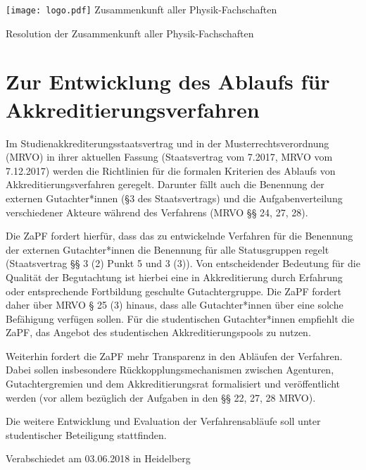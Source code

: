 \documentclass[DIV=calc]{scrartcl}
\begin{document}
    \hspace{0.87\textwidth}
    \begin{minipage}{120pt}
        \vspace{-1.8cm}
        \texttt{[image: logo.pdf]}
        \centering
        \small Zusammenkunft aller Physik-Fachschaften
    \end{minipage}
    \begin{center}
        \huge{Resolution der Zusammenkunft aller Physik-Fachschaften}\vspace{.25\baselineskip}\\
        \normalsize
    \end{center}
    \vspace{1cm} 
\section*{Zur Entwicklung des Ablaufs für Akkreditierungsverfahren}
Im Studienakkrediterungsstaatsvertrag und in der Musterrechtsverordnung (MRVO) in ihrer aktuellen Fassung (Staatsvertrag vom 7.2017, MRVO vom 7.12.2017) werden die Richtlinien für die formalen Kriterien des Ablaufs von Akkreditierungsverfahren geregelt. Darunter fällt auch die Benennung der externen Gutachter*innen (§3 des Staatsvertrags) und die Aufgabenverteilung verschiedener Akteure während des Verfahrens (MRVO §§ 24, 27, 28).

Die ZaPF fordert hierfür, dass das zu entwickelnde Verfahren für die Benennung der externen Gutachter*innen die Benennung für alle Statusgruppen regelt (Staatsvertrag §§ 3 (2) Punkt 5 und 3 (3)). Von entscheidender Bedeutung für die Qualität der Begutachtung ist hierbei eine in Akkreditierung durch Erfahrung oder entsprechende Fortbildung geschulte Gutachtergruppe. Die ZaPF fordert daher über MRVO § 25 (3) hinaus, dass alle Gutachter*innen über eine solche Befähigung verfügen sollen. Für die studentischen Gutachter*innen empfiehlt die ZaPF, das Angebot des studentischen Akkreditierungspools zu nutzen.

Weiterhin fordert die ZaPF mehr Transparenz in den Abläufen der Verfahren. Dabei sollen insbesondere Rückkopplungsmechanismen zwischen Agenturen, Gutachtergremien und dem Akkreditierungsrat formalisiert und veröffentlicht werden (vor allem bezüglich der Aufgaben in den §§ 22, 27, 28 MRVO).

Die weitere
Entwicklung und Evaluation der Verfahrensabläufe soll unter studentischer Beteiligung stattfinden. 
\vfill
    \begin{flushright}
        Verabschiedet am 03.06.2018 in Heidelberg
    \end{flushright}
\end{document}

